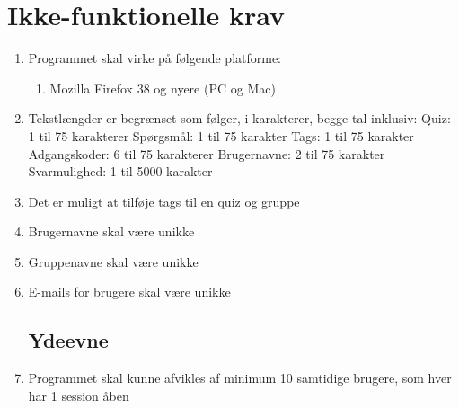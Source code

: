 \section{Ikke-funktionelle krav}
\label{sec:nonFunctional}

\begin{enumerate}
	\subsection*{Brugbarhed}
	\item Programmet skal virke på følgende platforme:
	\begin{enumerate}
		\item Mozilla Firefox 38 og nyere (PC og Mac)
	\end{enumerate}

	\item Tekstlængder er begrænset som følger, i karakterer, begge tal inklusiv:
	\subitem Quiz: 1 til 75 karakterer
	\subitem Spørgsmål: 1 til 75 karakter
	\subitem Tags: 1 til 75 karakter
	\subitem Adgangskoder: 6 til 75 karakterer
	\subitem Brugernavne: 2 til 75 karakter
	\subitem Svarmulighed: 1 til 5000 karakter
	\item Det er muligt at tilføje tags til en quiz og gruppe
	\item Brugernavne skal være unikke
	\item Gruppenavne skal være unikke
	\item E-mails for brugere skal være unikke
	
	\subsection*{Ydeevne}
	\item Programmet skal kunne afvikles af minimum 10 samtidige brugere, som hver har 1 session åben
\end{enumerate}